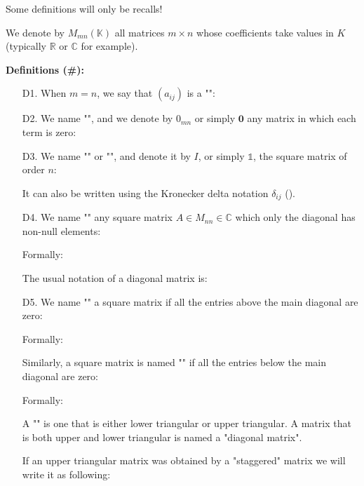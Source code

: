 	Some definitions will only be recalls!
	
	We denote by $M_{mn}(\mathbb{K})$ all matrices $m\times n$ whose coefficients take values in $K$ (typically $\mathbb{R}$ or $\mathbb{C}$ for example).
	
	\textbf{Definitions (\#\mydef):}
	\begin{enumerate}
		\item[D1.] When $m=n$, we say that $(a_{ij})$ is a "":
			

		\item[D2.] We name "", and we denote by $0_{mn}$ or simply $\mathbf{0}$ any matrix in which each term is zero:
			
	
		\item[D3.] We name "" or "", and denote it by $I$, or simply $\mathds{1}$, the square matrix of order $n$:
		
	
		It can also be written using the Kronecker delta notation $\delta_{ij}$ ().
		
		\item[D4.] We name "" any square matrix $A\in M_{nn}\in\mathbb{C}$ which only the diagonal has non-null elements:
		
		Formally:
		
		The usual notation of a diagonal matrix is:
		
		
		\item[D5.] We name "" a square matrix if all the entries above the main diagonal are zero:
		
		Formally:
		 
		 Similarly, a square matrix is named "" if all the entries below the main diagonal are zero:
		 
		Formally:
		 
		A "" is one that is either lower triangular or upper triangular. A matrix that is both upper and lower triangular is named a "diagonal matrix".
		
		If an upper triangular matrix was obtained by a "staggered" matrix we will write it as following:
		

\end{enumerate}
